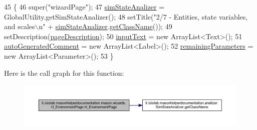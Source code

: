 \begin{DoxyCode}
45                                \{
46         super(\textcolor{stringliteral}{"wizardPage"});
47         \hyperlink{classit_1_1isislab_1_1masonhelperdocumentation_1_1mason_1_1wizards_1_1_h___environment_page_a7c2fe727aad8e12d87fd87203f4f8ec9}{simStateAnalizer} = GlobalUtility.getSimStateAnalizer(); 
48         setTitle(\textcolor{stringliteral}{"2/7 - Entities, state variables, and scales\(\backslash\)n"} + 
      \hyperlink{classit_1_1isislab_1_1masonhelperdocumentation_1_1mason_1_1wizards_1_1_h___environment_page_a7c2fe727aad8e12d87fd87203f4f8ec9}{simStateAnalizer}.\hyperlink{classit_1_1isislab_1_1masonhelperdocumentation_1_1analizer_1_1_sim_state_analizer_abc95a350e9935fa01ac2fa2344372472}{getClassName}());
49         setDescription(\hyperlink{classit_1_1isislab_1_1masonhelperdocumentation_1_1mason_1_1wizards_1_1_h___environment_page_ac8bda07b4ed1d63f8802efd712de59a0}{pageDescription});
50         \hyperlink{classit_1_1isislab_1_1masonhelperdocumentation_1_1mason_1_1wizards_1_1_h___environment_page_a297c64d886f958c23f954db7b953a46f}{inputText} = \textcolor{keyword}{new} ArrayList<Text>();
51         \hyperlink{classit_1_1isislab_1_1masonhelperdocumentation_1_1mason_1_1wizards_1_1_h___environment_page_a5495002868c1d72f31f79a3e584fdd60}{autoGeneratedComment} = \textcolor{keyword}{new} ArrayList<Label>();
52         \hyperlink{classit_1_1isislab_1_1masonhelperdocumentation_1_1mason_1_1wizards_1_1_h___environment_page_a3bfb6dff5b562361a410cd31ff8815ba}{remainingParameters} = \textcolor{keyword}{new} ArrayList<Parameter>();
53     \}
\end{DoxyCode}


Here is the call graph for this function\-:\nopagebreak
\begin{figure}[H]
\begin{center}
\leavevmode
\includegraphics[width=350pt]{classit_1_1isislab_1_1masonhelperdocumentation_1_1mason_1_1wizards_1_1_h___environment_page_a3a1a493e45a75cbea547a1fea9405b18_cgraph}
\end{center}
\end{figure}





